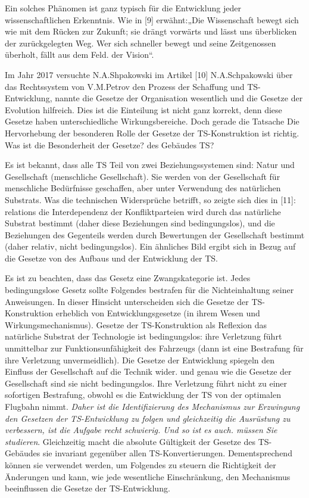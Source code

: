\documentclass[11pt,a4paper]{article}
\begin{document}
\begin{emph}
  Ein solches Phänomen ist ganz typisch für die Entwicklung jeder
  wissenschaftlichen Erkenntnis. Wie in [9] erwähnt:„Die Wissenschaft bewegt
  sich wie mit dem Rücken zur Zukunft; sie drängt vorwärts und lässt uns
  überblicken der zurückgelegten Weg. Wer sich schneller bewegt und seine
  Zeitgenossen überholt, fällt aus dem Feld.  der Vision“.
\end{emph}

Im Jahr 2017 versuchte N.A.Shpakowski im Artikel [10] N.A.Schpakowski über das
Rechtssystem von V.M.Petrov den Prozess der Schaffung und TS-Entwicklung,
nannte die Gesetze der Organisation wesentlich und die Gesetze der Evolution
hilfreich. Dies ist die Einteilung ist nicht ganz korrekt, denn diese Gesetze
haben unterschiedliche Wirkungsbereiche. Doch gerade die Tatsache Die
Hervorhebung der besonderen Rolle der Gesetze der TS-Konstruktion ist
richtig. Was ist die Besonderheit der Gesetze?  des Gebäudes TS?

Es ist bekannt, dass alle TS Teil von zwei Beziehungssystemen sind: Natur und
Gesellschaft (menschliche Gesellschaft).  Sie werden von der Gesellschaft für
menschliche Bedürfnisse geschaffen, aber unter Verwendung des natürlichen
Substrats.  Was die technischen Widersprüche betrifft, so zeigte sich dies in
[11]: relations die Interdependenz der Konfliktparteien wird durch das
natürliche Substrat bestimmt (daher diese Beziehungen sind bedingungslos), und
die Beziehungen des Gegenteils werden durch Bewertungen der Gesellschaft
bestimmt (daher relativ, nicht bedingungslos). Ein ähnliches Bild ergibt sich
in Bezug auf die Gesetze von des Aufbaus und der Entwicklung der TS.

Es ist zu beachten, dass das Gesetz eine Zwangskategorie ist. Jedes
bedingungslose Gesetz sollte Folgendes bestrafen für die Nichteinhaltung
seiner Anweisungen. In dieser Hinsicht unterscheiden sich die Gesetze der
TS-Konstruktion erheblich von Entwicklungsgesetze (in ihrem Wesen und
Wirkungsmechanismus). Gesetze der TS-Konstruktion als Reflexion das natürliche
Substrat der Technologie ist bedingungslos: ihre Verletzung führt unmittelbar
zur Funktionsunfähigkeit des Fahrzeugs (dann ist eine Bestrafung für ihre
Verletzung unvermeidlich). Die Gesetze der Entwicklung spiegeln den Einfluss
der Gesellschaft auf die Technik wider.  und genau wie die Gesetze der
Gesellschaft sind sie nicht bedingungslos. Ihre Verletzung führt nicht zu
einer sofortigen Bestrafung, obwohl es die Entwicklung der TS von der
optimalen Flugbahn nimmt. \emph{Daher ist die Identifizierung des Mechanismus
  zur Erzwingung den Gesetzen der TS-Entwicklung zu folgen und gleichzeitig
  die Ausrüstung zu verbessern, ist die Aufgabe recht schwierig. Und so ist es
  auch.  müssen Sie studieren}. Gleichzeitig macht die absolute Gültigkeit der
Gesetze des TS-Gebäudes sie invariant gegenüber allen TS-Konvertierungen.
Dementsprechend können sie verwendet werden, um Folgendes zu steuern die
Richtigkeit der Änderungen und kann, wie jede wesentliche Einschränkung, den
Mechanismus beeinflussen die Gesetze der TS-Entwicklung.
\end{document}
